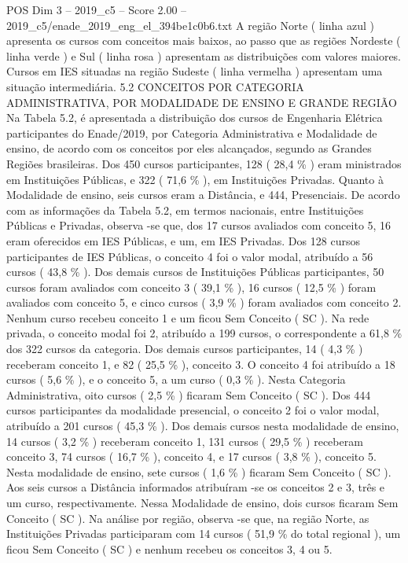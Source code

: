 \begin{textsample}{POS Dim 3 – 2019\_c5 – Score 2.00 – 2019\_c5/enade\_2019\_eng\_el\_394be1c0b6.txt}
A região Norte ( linha azul ) apresenta os cursos com conceitos mais baixos, ao passo que as regiões Nordeste ( linha verde ) e Sul ( linha rosa ) apresentam as distribuições com valores maiores.
Cursos em IES situadas na região Sudeste ( linha vermelha ) apresentam uma situação intermediária. 5.2 CONCEITOS POR CATEGORIA ADMINISTRATIVA, POR MODALIDADE DE ENSINO E GRANDE REGIÃO Na Tabela 5.2, é apresentada a distribuição dos cursos de Engenharia Elétrica participantes do Enade/2019, por Categoria Administrativa e Modalidade de ensino, de acordo com os conceitos por eles alcançados, segundo as Grandes Regiões brasileiras.
Dos 450 cursos participantes, 128 ( 28,4 \% ) eram ministrados em Instituições Públicas, e 322 ( 71,6 \% ), em Instituições Privadas.
Quanto à Modalidade de ensino, seis cursos eram a Distância, e 444, Presenciais.
De acordo com as informações da Tabela 5.2, em termos nacionais, entre Instituições Públicas e Privadas, observa -se que, dos 17 cursos avaliados com conceito 5, 16 eram oferecidos em IES Públicas, e um, em IES Privadas.
Dos 128 cursos participantes de IES Públicas, o conceito 4 foi o valor modal, atribuído a 56 cursos ( 43,8 \% ).
Dos demais cursos de Instituições Públicas participantes, 50 cursos foram avaliados com conceito 3 ( 39,1 \% ), 16 cursos ( 12,5 \% ) foram avaliados com conceito 5, e cinco cursos ( 3,9 \% ) foram avaliados com conceito 2.
Nenhum curso recebeu conceito 1 e um ficou Sem Conceito ( SC ).
Na rede privada, o conceito modal foi 2, atribuído a 199 cursos, o correspondente a 61,8 \% dos 322 cursos da categoria.
Dos demais cursos participantes, 14 ( 4,3 \% ) receberam conceito 1, e 82 ( 25,5 \% ), conceito 3.
O conceito 4 foi atribuído a 18 cursos ( 5,6 \% ), e o conceito 5, a um curso ( 0,3 \% ).
Nesta Categoria Administrativa, oito cursos ( 2,5 \% ) ficaram Sem Conceito ( SC ).
Dos 444 cursos participantes da modalidade presencial, o conceito 2 foi o valor modal, atribuído a 201 cursos ( 45,3 \% ).
Dos demais cursos nesta modalidade de ensino, 14 cursos ( 3,2 \% ) receberam conceito 1, 131 cursos ( 29,5 \% ) receberam conceito 3, 74 cursos ( 16,7 \% ), conceito 4, e 17 cursos ( 3,8 \% ), conceito 5.
Nesta modalidade de ensino, sete cursos ( 1,6 \% ) ficaram Sem Conceito ( SC ).
Aos seis cursos a Distância informados atribuíram -se os conceitos 2 e 3, três e um curso, respectivamente.
Nessa Modalidade de ensino, dois cursos ficaram Sem Conceito ( SC ).
Na análise por região, observa -se que, na região Norte, as Instituições Privadas participaram com 14 cursos ( 51,9 \% do total regional ), um ficou Sem Conceito ( SC ) e nenhum recebeu os conceitos 3, 4 ou 5.

\end{textsample}
